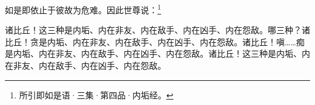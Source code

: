 如是即依止于彼故为危难。因此世尊说：\footnote{所引即如是语·三集·第四品·内垢经。}


\begin{quoting}诸比丘！这三种是内垢、内在非友、内在敌手、内在凶手、内在怨敌。哪三种？诸比丘！贪是内垢、内在非友、内在敌手、内在凶手、内在怨敌。诸比丘！嗔……痴是内垢、内在非友、内在敌手、内在凶手、内在怨敌。诸比丘！这三种是内垢、内在非友、内在敌手、内在凶手、内在怨敌。\end{quoting}


